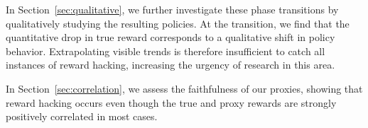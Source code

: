 
 
 In Section~\ref{sec:qualitative}, we further investigate these phase transitions by qualitatively studying the resulting policies. At the transition, we find that the quantitative drop in true reward corresponds to a qualitative shift in policy behavior. Extrapolating visible trends is therefore insufficient to catch all instances of reward hacking, increasing the urgency of research in this area.
 
 In Section~\ref{sec:correlation}, we assess the faithfulness of our proxies, showing that reward hacking occurs even though the true and proxy rewards are strongly positively correlated in most cases.  
 



